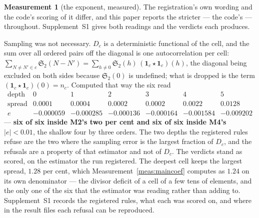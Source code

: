 \documentclass[11pt,a4paper]{article}
\theoremstyle{plain}
\theoremstyle{definition}
\newtheorem{measurement}[theorem]{Measurement}
\theoremstyle{remark}
\renewcommand{\SS}{\mathfrak{S}}
\begin{document}
\begin{measurement}[the exponent, measured]
The registration's own wording and the code's scoring of it differ, and
this paper reports the stricter --- the code's --- throughout.
Supplement~S1 gives both readings and the verdicts each produces.

Sampling was not necessary. $D_c$ is a deterministic functional of the
cell, and the sum over all ordered pairs off the diagonal is one
autocorrelation per cell:
$\sum_{N\neq N'\in c}\SS_2(N-N')
=\sum_{h\neq0}\SS_2(h)\,(\mathbf 1_c\star\mathbf 1_c)(h)$, the
diagonal being excluded on both sides because $\SS_2(0)$ is undefined;
what is dropped is the term $(\mathbf 1_c\star\mathbf 1_c)(0)=n_c$.
Computed that way
the six read
\[
\begin{array}{r|cccccc}
 \text{depth} & 0 & 1 & 2 & 3 & 4 & 5\\\hline
 \text{spread} & 0.0001 & 0.0004 & 0.0002 & 0.0002 & 0.0022 & 0.0128\\
 e & -0.000059 & -0.000285 & -0.000136 & -0.000164 & -0.001584
   & -0.009202
\end{array}
\]
--- \textbf{six of six inside M2's two per cent and six of six inside
M4's $|e|<0.01$}, the shallow four by three orders. The two depths the
registered rules refuse are the two where the sampling error is the
largest fraction of $D_c$, and the refusals are a property of that
estimator and not of $D_c$. The verdicts stand as scored, on the
estimator the run registered. The deepest cell keeps the largest
spread, $1.28$ per cent, which Measurement~\ref{meas:maincoef}
computes as $1.24$ on its own denominator --- the divisor deficit of a
cell of a few tens of elements, and the only one of the six that the
estimator was reading rather than adding to. Supplement~S1 records the
registered rules, what each was scored on, and where in the result
files each refusal can be reproduced.


\end{measurement}
\end{document}
